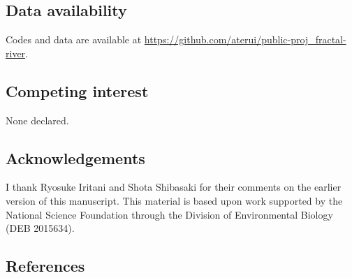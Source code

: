 \documentclass[
  12pt,
]{article}
\begin{document}
\hypertarget{data-availability}{%
\subsection{Data availability}\label{data-availability}}

Codes and data are available at \url{https://github.com/aterui/public-proj_fractal-river}.

\hypertarget{competing-interest}{%
\subsection{Competing interest}\label{competing-interest}}

None declared.

\hypertarget{acknowledgements}{%
\subsection{Acknowledgements}\label{acknowledgements}}

I thank Ryosuke Iritani and Shota Shibasaki for their comments on the earlier version of this manuscript. This material is based upon work supported by the National Science Foundation through the Division of Environmental Biology (DEB 2015634).

\pagebreak

\hypertarget{references}{%
\subsection*{References}\label{references}}
\end{document}
